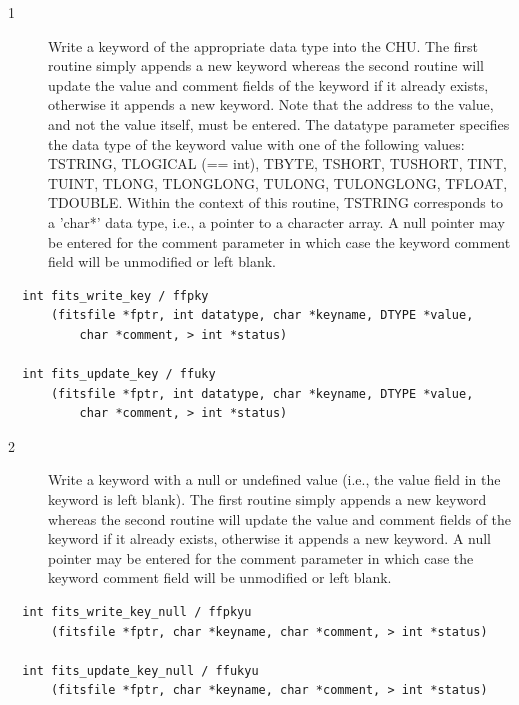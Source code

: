 \documentclass[11pt]{book}
\begin{document}
\begin{description}
\item[1 ] Write a keyword of the appropriate data type into the
    CHU.  The first routine simply appends a new keyword whereas the
    second routine will update the value and comment fields of the
    keyword if it already exists, otherwise it appends a new
    keyword.  Note that the address to the value, and not the value
    itself, must be entered.    The datatype parameter specifies the
    data type of the keyword value with one of the following values:
    TSTRING, TLOGICAL (== int), TBYTE, TSHORT, TUSHORT, TINT, TUINT,
    TLONG, TLONGLONG, TULONG, TULONGLONG, TFLOAT, TDOUBLE.  Within the 
    context of this routine, TSTRING corresponds to a 'char*' data type,
    i.e., a pointer to a character array.  A null pointer may be entered 
    for the comment parameter in which case the  keyword comment
   field will be unmodified or left blank.  \label{ffpky} \label{ffuky}
\end{description}

\begin{verbatim}
  int fits_write_key / ffpky
      (fitsfile *fptr, int datatype, char *keyname, DTYPE *value,
          char *comment, > int *status)

  int fits_update_key / ffuky
      (fitsfile *fptr, int datatype, char *keyname, DTYPE *value,
          char *comment, > int *status)
\end{verbatim}

\begin{description}
\item[2 ] Write a keyword with a null or undefined value (i.e., the
    value field in the keyword is left blank).  The first routine
    simply appends a new keyword whereas the second routine will update
    the value and comment fields of the keyword if it already exists,
    otherwise it appends a new keyword.  A null pointer may be
    entered for the comment parameter in which case the  keyword
    comment
   field will be unmodified or left blank. \label{ffpkyu} \label{ffukyu}
\end{description}

\begin{verbatim}
  int fits_write_key_null / ffpkyu
      (fitsfile *fptr, char *keyname, char *comment, > int *status)

  int fits_update_key_null / ffukyu
      (fitsfile *fptr, char *keyname, char *comment, > int *status)
\end{verbatim}
\end{document}
